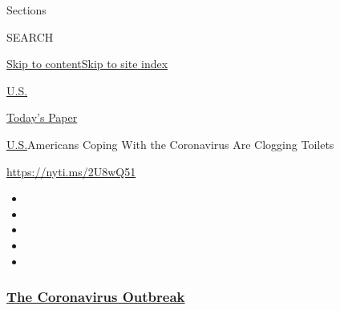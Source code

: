 Sections

SEARCH

\protect\hyperlink{site-content}{Skip to
content}\protect\hyperlink{site-index}{Skip to site index}

\href{https://www.nytimes3xbfgragh.onion/section/us}{U.S.}

\href{https://myaccount.nytimes3xbfgragh.onion/auth/login?response_type=cookie\&client_id=vi}{}

\href{https://www.nytimes3xbfgragh.onion/section/todayspaper}{Today's
Paper}

\href{/section/us}{U.S.}\textbar{}Americans Coping With the Coronavirus
Are Clogging Toilets

\url{https://nyti.ms/2U8wQ51}

\begin{itemize}
\item
\item
\item
\item
\item
\end{itemize}

\hypertarget{the-coronavirus-outbreak}{%
\subsubsection{\texorpdfstring{\href{https://www.nytimes3xbfgragh.onion/news-event/coronavirus?name=styln-coronavirus-national\&region=TOP_BANNER\&variant=undefined\&block=storyline_menu_recirc\&action=click\&pgtype=Article\&impression_id=5941d4e0-e38a-11ea-918c-0f8207e68c04}{The
Coronavirus
Outbreak}}{The Coronavirus Outbreak}}\label{the-coronavirus-outbreak}}

